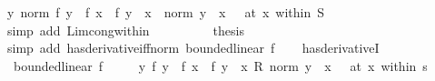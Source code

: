 \begin{isabellebody}
\ {\isachardoublequoteopen}{\isacharparenleft}{\kern0pt}{\isacharparenleft}{\kern0pt}{\isasymlambda}y{\isachardot}{\kern0pt}\ norm\ {\isacharparenleft}{\kern0pt}f\ y\ {\isacharminus}{\kern0pt}\ f\ x\ {\isacharminus}{\kern0pt}\ f{\isacharprime}{\kern0pt}\ {\isacharparenleft}{\kern0pt}y\ {\isacharminus}{\kern0pt}\ x{\isacharparenright}{\kern0pt}{\isacharparenright}{\kern0pt}\ {\isacharslash}{\kern0pt}\ norm\ {\isacharparenleft}{\kern0pt}y\ {\isacharminus}{\kern0pt}\ x{\isacharparenright}{\kern0pt}{\isacharparenright}{\kern0pt}\ {\isasymlonglongrightarrow}\ {}{\isacharparenright}{\kern0pt}\ {\isacharparenleft}{\kern0pt}at\ x\ within\ S{\isacharparenright}{\kern0pt}{\isachardoublequoteclose}\isanewline
\ \ \ \ \ \ \isamarkupfalse%
\ {\isacharparenleft}{\kern0pt}simp\ add{\isacharcolon}{\kern0pt}\ Lim{\isacharunderscore}{\kern0pt}cong{\isacharunderscore}{\kern0pt}within\ {}\ {}{\isacharparenright}{\kern0pt}\isanewline
\ \ \ \ \isamarkupfalse%
\ \isamarkupfalse%
\ {\isacharquery}{\kern0pt}thesis\isanewline
\ \ \ \ \ \ \isamarkupfalse%
\ {\isacharparenleft}{\kern0pt}simp\ add{\isacharcolon}{\kern0pt}\ has{\isacharunderscore}{\kern0pt}derivative{\isacharunderscore}{\kern0pt}iff{\isacharunderscore}{\kern0pt}norm\ {\isacartoucheopen}bounded{\isacharunderscore}{\kern0pt}linear\ f{\isacharprime}{\kern0pt}{\isacartoucheclose}{\isacharparenright}{\kern0pt}\isanewline
\ \ \isamarkupfalse%
\isanewline
{}\isamarkupfalse%
%
\endisatagproof
{\isafoldproof}%
%
\isadelimproof
\isanewline
%
\endisadelimproof
\isanewline
{}\isamarkupfalse%
\ has{\isacharunderscore}{\kern0pt}derivativeI{\isacharcolon}{\kern0pt}\isanewline
\ \ {\isachardoublequoteopen}bounded{\isacharunderscore}{\kern0pt}linear\ f{\isacharprime}{\kern0pt}\ {\isasymLongrightarrow}\isanewline
\ \ \ \ {\isacharparenleft}{\kern0pt}{\isacharparenleft}{\kern0pt}{\isasymlambda}y{\isachardot}{\kern0pt}\ {\isacharparenleft}{\kern0pt}{\isacharparenleft}{\kern0pt}f\ y\ {\isacharminus}{\kern0pt}\ f\ x{\isacharparenright}{\kern0pt}\ {\isacharminus}{\kern0pt}\ f{\isacharprime}{\kern0pt}\ {\isacharparenleft}{\kern0pt}y\ {\isacharminus}{\kern0pt}\ x{\isacharparenright}{\kern0pt}{\isacharparenright}{\kern0pt}\ {\isacharslash}{\kern0pt}\isactrlsub R\ norm\ {\isacharparenleft}{\kern0pt}y\ {\isacharminus}{\kern0pt}\ x{\isacharparenright}{\kern0pt}{\isacharparenright}{\kern0pt}\ {\isasymlonglongrightarrow}\ {}{\isacharparenright}{\kern0pt}\ {\isacharparenleft}{\kern0pt}at\ x\ within\ s{\isacharparenright}{\kern0pt}\ {\isasymLongrightarrow}\isanewline

\end{isabellebody}
